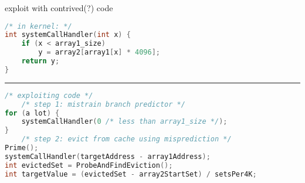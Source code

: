 \begin{frame}[fragile]{exploit with contrived(?) code}
\begin{lstlisting}[language=C,style=smaller]
/* in kernel: */
int systemCallHandler(int x) {
    if (x < array1_size)
        y = array2[array1[x] * 4096];
    return y;
}
\end{lstlisting}
\hrule
\begin{lstlisting}[language=C,style=smaller]
/* exploiting code */
    /* step 1: mistrain branch predictor */
for (a lot) {
    systemCallHandler(0 /* less than array1_size */);
}
    /* step 2: evict from cache using misprediction */
Prime();
systemCallHandler(targetAddress - array1Address);
int evictedSet = ProbeAndFindEviction();
int targetValue = (evictedSet - array2StartSet) / setsPer4K;
\end{lstlisting}
\end{frame}
